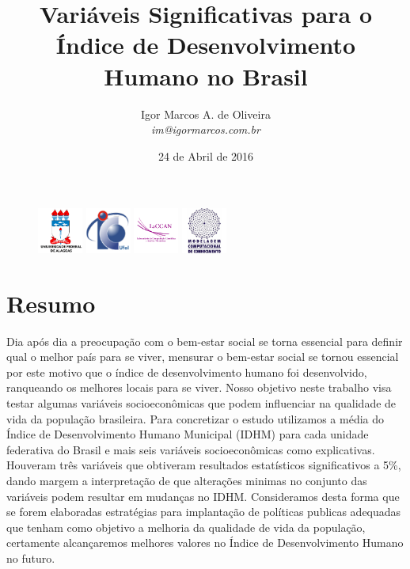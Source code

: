 \documentclass[10pt,foldmark,notumble]{leaflet}
\title{\bf Variáveis Significativas para o Índice de Desenvolvimento Humano no Brasil}
\author{
Igor Marcos A. de Oliveira \\ \emph{im@igormarcos.com.br}
}
\date{24 de Abril de 2016}
\begin{document}
\maketitle

\begin{figure}[H]
\centering
\includegraphics[height=1.5cm]{Images/aau_logo_new_circle-UFAL.pdf} \quad
\includegraphics[height=1.5cm]{Images/aau_logo_new_circle-IC.pdf} \quad
\includegraphics[height=1.5cm]{Images/aau_logo_new_circle-LACCAN.pdf} \quad
\includegraphics[height=1.5cm]{Images/aau_logo_new_circle-MODELAGEM.pdf}
\label{logo}
\end{figure}

\section{Resumo} Dia após dia a preocupação com o bem-estar social se torna essencial para definir qual o melhor país para se viver, mensurar o bem-estar social se tornou essencial por este motivo que o índice de desenvolvimento humano foi desenvolvido, ranqueando os melhores locais para se viver. Nosso objetivo neste trabalho visa testar algumas variáveis socioeconômicas que podem influenciar na qualidade de vida da população brasileira. Para concretizar o estudo utilizamos a média do Índice de Desenvolvimento Humano Municipal (IDHM) para cada unidade federativa do Brasil e mais seis variáveis socioeconômicas como explicativas.
Houveram três variáveis que obtiveram resultados estatísticos significativos a 5\%, dando margem a interpretação de que alterações minimas no conjunto das variáveis podem resultar em mudanças no IDHM. Consideramos desta forma que se forem elaboradas estratégias para implantação de políticas publicas adequadas que tenham como objetivo a melhoria da qualidade de vida da população, certamente alcançaremos melhores valores no Índice de Desenvolvimento Humano no futuro.
\end{document}
